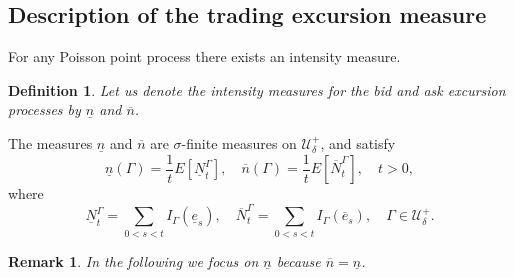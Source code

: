 \documentclass[11pt]{scrartcl}
\newtheorem{definition}[theorem]{Definition}
\newtheorem{remark}[theorem]{Remark}
\newcommand{\nbid}{\underline{n}}
\newcommand{\nask}{\overline{n}}
\begin{document}
\subsection{Description of the trading excursion measure\label{x-measure}}
For any Poisson point process there exists an intensity measure.
\begin{definition}
Let us denote the intensity measures for the bid and ask excursion processes
by $\underline{n}$ and $\overline{n}$.
\end{definition}
The measures $\nbid$ and $\nask$ are $\sigma$-finite measures on $\mathcal{U}_\delta^+$,
and satisfy
\begin{equation}
\nbid(\Gamma)=\frac{1}{t}E[\underline{N}_t^\Gamma],\quad
\nask(\Gamma)=\frac{1}{t}E[\overline{N}_t^\Gamma],\quad t>0,
\end{equation}
where
\begin{equation}
\underline{N}_t^\Gamma=\sum_{0<s<t}I_{\Gamma}(\underline{e}_s),\quad
\overline{N}_t^\Gamma=\sum_{0<s<t}I_{\Gamma}(\overline{e}_s),\quad \Gamma\in \mathcal U_\delta^+.
\end{equation}


\begin{remark}
In the following we focus on $\underline{n}$ because $\overline n = \underline n$.
\end{remark}
\end{document}
